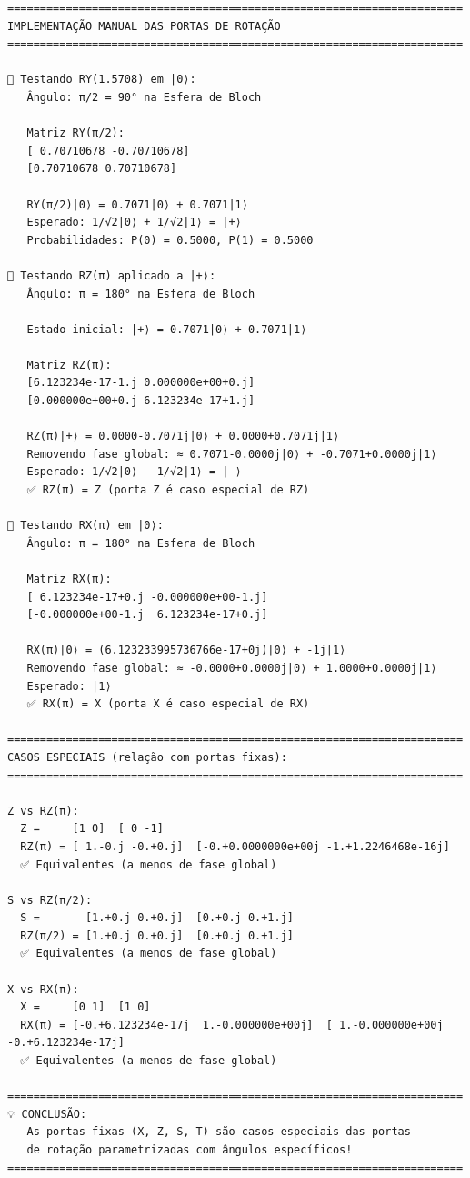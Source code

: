 \documentclass[
  brazilian,
]{report}
\begin{document}
\begin{verbatim}
======================================================================
IMPLEMENTAÇÃO MANUAL DAS PORTAS DE ROTAÇÃO
======================================================================

🔹 Testando RY(1.5708) em |0⟩:
   Ângulo: π/2 = 90° na Esfera de Bloch

   Matriz RY(π/2):
   [ 0.70710678 -0.70710678]
   [0.70710678 0.70710678]

   RY(π/2)|0⟩ = 0.7071|0⟩ + 0.7071|1⟩
   Esperado: 1/√2|0⟩ + 1/√2|1⟩ = |+⟩
   Probabilidades: P(0) = 0.5000, P(1) = 0.5000

🔹 Testando RZ(π) aplicado a |+⟩:
   Ângulo: π = 180° na Esfera de Bloch

   Estado inicial: |+⟩ = 0.7071|0⟩ + 0.7071|1⟩

   Matriz RZ(π):
   [6.123234e-17-1.j 0.000000e+00+0.j]
   [0.000000e+00+0.j 6.123234e-17+1.j]

   RZ(π)|+⟩ = 0.0000-0.7071j|0⟩ + 0.0000+0.7071j|1⟩
   Removendo fase global: ≈ 0.7071-0.0000j|0⟩ + -0.7071+0.0000j|1⟩
   Esperado: 1/√2|0⟩ - 1/√2|1⟩ = |-⟩
   ✅ RZ(π) = Z (porta Z é caso especial de RZ)

🔹 Testando RX(π) em |0⟩:
   Ângulo: π = 180° na Esfera de Bloch

   Matriz RX(π):
   [ 6.123234e-17+0.j -0.000000e+00-1.j]
   [-0.000000e+00-1.j  6.123234e-17+0.j]

   RX(π)|0⟩ = (6.123233995736766e-17+0j)|0⟩ + -1j|1⟩
   Removendo fase global: ≈ -0.0000+0.0000j|0⟩ + 1.0000+0.0000j|1⟩
   Esperado: |1⟩
   ✅ RX(π) = X (porta X é caso especial de RX)

======================================================================
CASOS ESPECIAIS (relação com portas fixas):
======================================================================

Z vs RZ(π):
  Z =     [1 0]  [ 0 -1]
  RZ(π) = [ 1.-0.j -0.+0.j]  [-0.+0.0000000e+00j -1.+1.2246468e-16j]
  ✅ Equivalentes (a menos de fase global)

S vs RZ(π/2):
  S =       [1.+0.j 0.+0.j]  [0.+0.j 0.+1.j]
  RZ(π/2) = [1.+0.j 0.+0.j]  [0.+0.j 0.+1.j]
  ✅ Equivalentes (a menos de fase global)

X vs RX(π):
  X =     [0 1]  [1 0]
  RX(π) = [-0.+6.123234e-17j  1.-0.000000e+00j]  [ 1.-0.000000e+00j -0.+6.123234e-17j]
  ✅ Equivalentes (a menos de fase global)

======================================================================
💡 CONCLUSÃO:
   As portas fixas (X, Z, S, T) são casos especiais das portas
   de rotação parametrizadas com ângulos específicos!
======================================================================
\end{verbatim}
\end{document}
